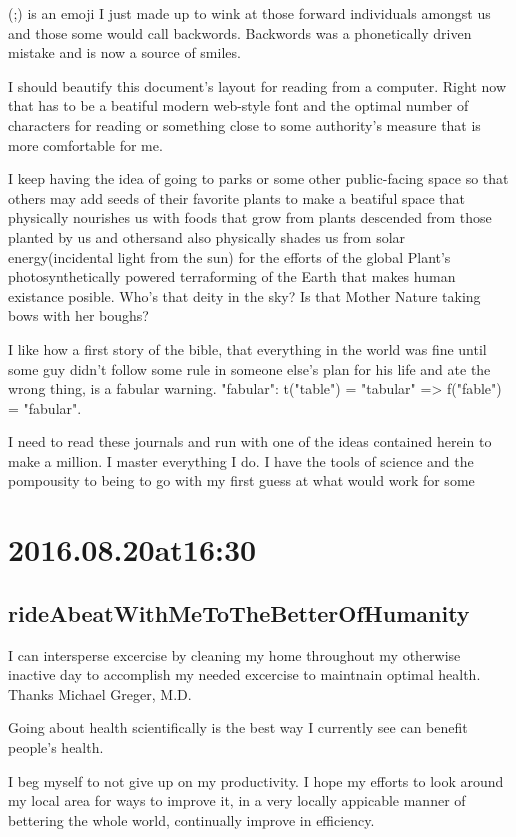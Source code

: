 (;) is an emoji I just made up to wink at those forward individuals amongst us and those some would call backwords. Backwords was a phonetically driven mistake and is now a source of smiles.

I should beautify this document's layout for reading from a computer. Right now that has to be a beatiful modern web-style font and the optimal number of characters for reading or something close to some authority's measure that is more comfortable for me. 

I keep having the idea of going to parks or some other public-facing space so that others may add seeds of their favorite plants to make a beatiful space that physically nourishes us with foods that grow from plants descended from those planted by us and othersand also physically shades us from solar energy(incidental light from the sun) for the efforts of the global Plant's photosynthetically powered terraforming of the Earth that makes human existance posible. Who's that deity in the sky? Is that Mother Nature taking bows with her boughs?

I like how a first story of the bible, that everything in the world was fine until some guy didn't follow some rule in someone else's plan for his life and ate the wrong thing, is a fabular warning. "fabular": t("table") = "tabular" => f("fable") = "fabular".

I need to read these journals and run with one of the ideas contained herein to make a million. I master everything I do. I have the tools of science and the pompousity to being to go with my first guess at what would work for some 

\section*{ 2016.08.20at16:30 }
\subsection*{rideAbeatWithMeToTheBetterOfHumanity}
I can intersperse excercise by cleaning my home throughout my otherwise inactive day to accomplish my needed excercise to maintnain optimal health. Thanks Michael Greger, M.D.

Going about health scientifically is the best way I currently see can benefit people's health.

I beg myself to not give up on my productivity. I hope my efforts to look around my local area for ways to improve it, in a very locally appicable manner of bettering the whole world, continually improve in efficiency.

